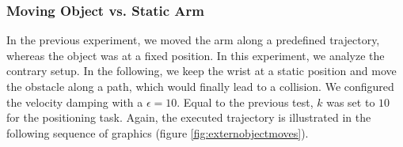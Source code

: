 \subsubsection*{Moving Object vs. Static Arm}
In the previous experiment, we moved the arm along a predefined trajectory, whereas the object was at a fixed position. In this experiment, we analyze the contrary setup. In the following, we keep the wrist at a static position and move the obstacle along a path, which would finally lead to a collision. We configured the velocity damping with a $\epsilon=10$. Equal to the previous test, $k$ was set to $10$ for the positioning task. Again, the executed trajectory is illustrated in the following sequence of graphics (figure \ref{fig:externobjectmoves}).
\begin{figure}[h!]
  \centering
\end{figure}
